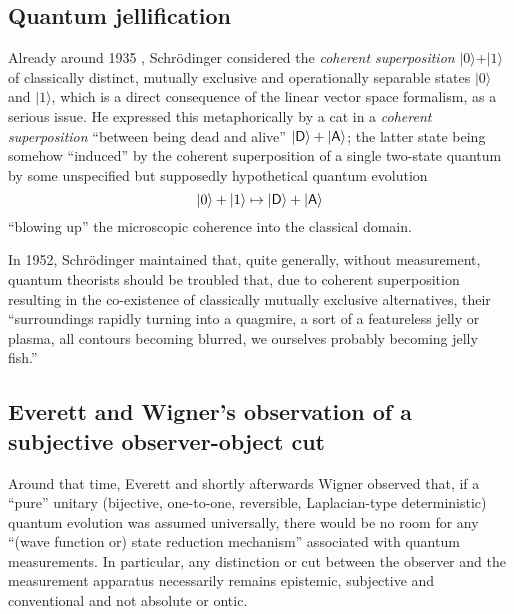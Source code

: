\documentclass[%
  preprint,
 showpacs,
 showkeys,
 preprintnumbers,
 amsmath,amssymb,
 aps,
   pra,
  longbibliography,
 ]{revtex4-1}
\begin{document}
\subsection{Quantum jellification}


Already around 1935 \cite{schrodinger}, Schr\"odinger considered the {\em coherent superposition}
$\vert 0 \rangle + \vert 1 \rangle$ of classically distinct, mutually exclusive and operationally separable states
$\vert 0 \rangle$
and
$\vert 1 \rangle$,
which is a direct consequence of the linear vector space formalism,
as a serious issue.
He expressed this metaphorically by a cat in a {\em coherent superposition}
``between being dead and alive'' $\vert {\textsf D} \rangle + \vert {\textsf A} \rangle$; the latter state being somehow
``induced'' by the coherent superposition of a single two-state quantum by some unspecified but supposedly hypothetical quantum evolution
\begin{equation}
\vert 0 \rangle + \vert 1 \rangle \mapsto \vert {\textsf D} \rangle + \vert {\textsf A} \rangle
\label{2012-psqm-v2-e1}
\end{equation}
``blowing up'' the microscopic coherence into the classical domain.


In 1952, Schr\"odinger maintained  \cite[pp. 19]{schroedinger-interpretation} that, quite generally,
without measurement, quantum theorists should be troubled that, due to coherent superposition
resulting in the co-existence of classically mutually exclusive alternatives,
their ``surroundings rapidly turning into a quagmire, a sort of a featureless jelly or plasma,
all contours becoming blurred, we ourselves probably becoming jelly fish.''



\subsection{Everett and Wigner's observation of a subjective observer-object cut}

Around that time,
Everett \cite[p.~454]{everett} and shortly afterwards Wigner \cite[p.~173]{wigner:mb}
observed that,
if a ``pure'' unitary (bijective, one-to-one, reversible, Laplacian-type deterministic) quantum evolution was assumed universally,
there would be no room for any ``(wave function or) state reduction mechanism''
associated with quantum measurements.
In particular, any distinction or cut between the observer and the measurement apparatus necessarily remains epistemic, subjective and conventional
and not absolute or ontic.
\end{document}
